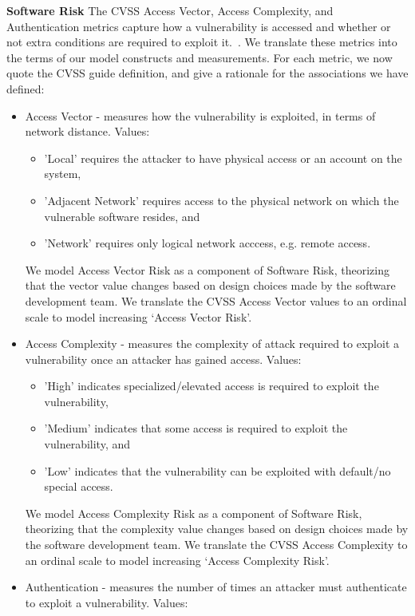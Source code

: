 \textbf{Software Risk}
\label{sec:evaluation_nvd_selection_risk}
The CVSS Access Vector, Access Complexity, and Authentication metrics capture how a vulnerability is accessed and whether or not extra conditions are required to exploit it.~\cite{mell2007complete}. We translate these metrics into the terms of our model constructs and measurements. For each metric, we now quote the CVSS guide definition, and give a rationale for the associations we have defined:
\begin{itemize}
	\item Access Vector - measures how the vulnerability is exploited, in terms of network distance. Values:
	\begin{itemize}
		\item 'Local' requires the attacker to have physical access or an account on the system, \item 'Adjacent Network' requires access to the physical network on which the vulnerable software resides, and \item 'Network' requires only logical network acccess, e.g. remote access. 
	\end{itemize}
	We model Access Vector Risk as a component of Software Risk, theorizing that the vector value changes based on design choices made by the software development team. We translate the CVSS Access Vector values to an ordinal scale to model increasing `Access Vector Risk'.
	\item Access Complexity - measures the complexity of attack required to exploit a vulnerability once an attacker has gained access. Values: 
	\begin{itemize}
		\item 'High' indicates specialized/elevated access is required to exploit the vulnerability, 
		\item 'Medium' indicates that some access is required to exploit the vulnerability, and \item 'Low' indicates that the vulnerability can be exploited with default/no special access.  
	\end{itemize}
	We model Access Complexity Risk as a component of Software Risk, theorizing that the complexity value changes based on design choices made by the software development team. We translate the CVSS Access Complexity  to an ordinal scale to model increasing `Access Complexity Risk'.
	\item Authentication - measures the number of times an attacker must authenticate to exploit a vulnerability. Values: 
	\begin{itemize}

\end{itemize}
\end{itemize}
